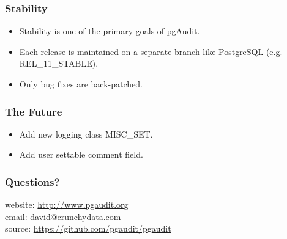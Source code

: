 \begin{frame}
    \frametitle{Stability}

    \begin{itemize}
        \item Stability is one of the primary goals of pgAudit.
        \item Each release is maintained on a separate branch like PostgreSQL (e.g. REL\_11\_STABLE).
        \item Only bug fixes are back-patched.
    \end{itemize}
\end{frame}

\begin{frame}
    \frametitle{The Future}

    \begin{itemize}
        \item Add new logging class MISC\_SET.
        \item Add user settable comment field.
    \end{itemize}
\end{frame}

\begin{frame}
    \frametitle{Questions?}

    website: \url{http://www.pgaudit.org}\\
    \vspace{1em}
    email: \href{mailto:david@crunchydata.com}{david@crunchydata.com}\\
    \vspace{1em}
    source: \url{https://github.com/pgaudit/pgaudit}
\end{frame}


